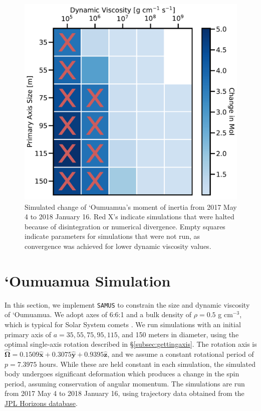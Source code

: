 \documentclass[twocolumn,doublespacing]{aastex631}
\begin{document}
\begin{figure}
\centering
\includegraphics[width=\linewidth,angle=0]{optimal_axis_heatmap.pdf}
\caption{Simulated change of `Oumuamua's moment of inertia from 2017 May 4 to 2018 January 16. Red X's indicate simulations that were halted because of disintegration or numerical divergence. Empty squares indicate parameters for simulations that were not run, as convergence was achieved for lower dynamic viscosity values. }
\label{fig:optimalaxisheatmap}
\end{figure}

\section{`Oumuamua Simulation}\label{sec:oumuamuasim}

In this section, we implement \texttt{SAMUS} to constrain the size and dynamic viscosity of `Oumuamua. We adopt axes of 6:6:1 and a bulk density of $\rho=0.5$ g cm$^{-3}$, which is typical for Solar System comets \citep{britt2006}. We run simulations with an initial primary axis of $a=35,55,75,95,115$, and 150 meters in diameter, using the optimal single-axis rotation described in \S\ref{subsec:gettingaxis}. The rotation axis is $\boldsymbol{\hat{\Omega}}=0.1509\boldsymbol{\hat{x}}+0.3075\boldsymbol{\hat{y}}+0.9395\boldsymbol{\hat{z}}$, and we assume a constant rotational period of $p=7.3975$ hours. While these are held constant in each simulation, the simulated body undergoes significant deformation which produces a change in the spin period, assuming conservation of angular momentum. The simulations are run from 2017 May 4 to 2018 January 16, using trajectory data obtained from the \href{https://ssd.jpl.nasa.gov/horizons.cgi}{JPL Horizons database}.
\end{document}

